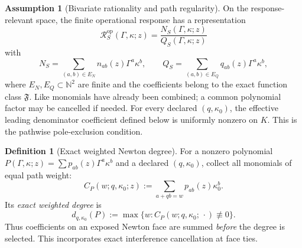 \documentclass[11pt]{article}
\theoremstyle{definition}
\newtheorem{definition}[theorem]{Definition}
\newtheorem{assumption}[theorem]{Assumption}
\theoremstyle{remark}
\theoremstyle{plain}
\newcommand{\R}{\mathcal R}
\newcommand{\op}{\mathrm{op}}
\begin{document}
\begin{assumption}[Bivariate rationality and path regularity]
\label{ass:bivariate}
On the response-relevant space, the finite operational response has a
representation
\begin{equation}\label{eq:bivariate-rational}
 \R_S^{\op}(\Gamma,\kappa;z)
 =\frac{N_S(\Gamma,\kappa;z)}
        {Q_S(\Gamma,\kappa;z)}
\end{equation}
with
\[
 N_S=\sum_{(a,b)\in E_N}n_{ab}(z)\Gamma^a\kappa^b,
 \qquad
 Q_S=\sum_{(a,b)\in E_Q}q_{ab}(z)\Gamma^a\kappa^b,
\]
where $E_N,E_Q\subset\mathbb N^2$ are finite and the coefficients belong to
the exact function class $\mathfrak F$.  Like monomials have already been
combined; a common polynomial factor may be cancelled if needed.  For every
declared $(q,\kappa_0)$, the effective leading denominator coefficient
defined below is uniformly nonzero on $K$.  This is the pathwise
pole-exclusion condition.
\end{assumption}

\begin{definition}[Exact weighted Newton degree]\label{def:weighted-degree}
For a nonzero polynomial
$P(\Gamma,\kappa;z)=\sum p_{ab}(z)\Gamma^a\kappa^b$ and a declared
$(q,\kappa_0)$, collect all monomials of equal path weight:
\begin{equation}
 C_P(w;q,\kappa_0;z)
 :=\sum_{a+qb=w}p_{ab}(z)\kappa_0^b.
\end{equation}
Its \emph{exact weighted degree} is
\begin{equation}\label{eq:exact-weighted-degree}
 d_{q,\kappa_0}(P)
 :=\max\{w:C_P(w;q,\kappa_0;\,\cdot)\not\equiv0\}.
\end{equation}
Thus coefficients on an exposed Newton face are summed \emph{before} the
degree is selected.  This incorporates exact interference cancellation at
face ties.
\end{definition}
\end{document}

